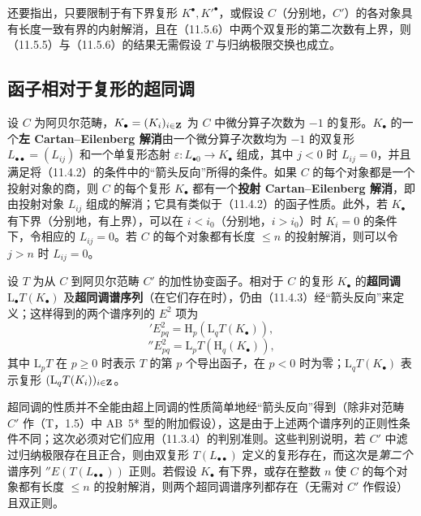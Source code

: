 还要指出，只要限制于有下界复形 $K^\bullet,K'^\bullet$，或假设 $C$（分别地，$C'$）的各对象具有长度一致有界的内射解消，且在（11.5.6）中两个双复形的第二次数有上界，则（11.5.5）与（11.5.6）的结果无需假设 $T$ 与归纳极限交换也成立。\par

\subsection{函子相对于复形的超同调}
设 $C$ 为阿贝尔范畴，$K_\bullet=(K_i)_{i\in\mathbf Z}$ 为 $C$ 中微分算子次数为 $-1$ 的复形。$K_\bullet$ 的一个\textbf{左 Cartan--Eilenberg 解消}由一个微分算子次数均为 $-1$ 的双复形 $L_{\bullet\bullet}=(L_{ij})$ 和一个单复形态射 $\varepsilon:L_{\bullet0}\to K_\bullet$ 组成，其中 $j<0$ 时 $L_{ij}=0$，并且满足将（11.4.2）的条件中的“箭头反向”所得的条件。如果 $C$ 的每个对象都是一个投射对象的商，则 $C$ 的每个复形 $K_\bullet$ 都有一个\textbf{投射 Cartan--Eilenberg 解消}，即由投射对象 $L_{ij}$ 组成的解消；它具有类似于（11.4.2）的函子性质。此外，若 $K_\bullet$ 有下界（分别地，有上界），可以在 $i<i_0$（分别地，$i>i_0$）时 $K_i=0$ 的条件下，令相应的 $L_{ij}=0$。若 $C$ 的每个对象都有长度 $\leq n$ 的投射解消，则可以令 $j>n$ 时 $L_{ij}=0$。

设 $T$ 为从 $C$ 到阿贝尔范畴 $C'$ 的加性协变函子。相对于 $C$ 的复形 $K_\bullet$ 的\textbf{超同调} $\mathrm L_\bullet T(K_\bullet)$ 及\textbf{超同调谱序列}（在它们存在时），仍由（11.4.3）经“箭头反向”来定义；这样得到的两个谱序列的 $E^2$ 项为
\begin{equation}\tag{11.6.2.1}
{}'E^2_{pq}=\mathrm H_p(\mathrm L_qT(K_\bullet)),
\end{equation}
\begin{equation}\tag{11.6.2.2}
{}''E^2_{pq}=\mathrm L_pT(\mathrm H_q(K_\bullet)),
\end{equation}
其中 $\mathrm L_pT$ 在 $p\geq0$ 时表示 $T$ 的第 $p$ 个导出函子，在 $p<0$ 时为零；$\mathrm L_qT(K_\bullet)$ 表示复形 $(\mathrm L_qT(K_i))_{i\in\mathbf Z}$。

超同调的性质并不全能由超上同调的性质简单地经“箭头反向”得到（除非对范畴 $C'$ 作（T，1.5）中 AB~5* 型的附加假设），这是由于上述两个谱序列的正则性条件不同；这次必须对它们应用（11.3.4）的判别准则。这些判别说明，若 $C'$ 中滤过归纳极限存在且正合，则由双复形 $T(L_{\bullet\bullet})$ 定义的复形存在，而这次是\emph{第二个}谱序列 ${}''E(T(L_{\bullet\bullet}))$ 正则。若假设 $K_\bullet$ 有下界，或存在整数 $n$ 使 $C$ 的每个对象都有长度 $\leq n$ 的投射解消，则两个超同调谱序列都存在（无需对 $C'$ 作假设）且双正则。

